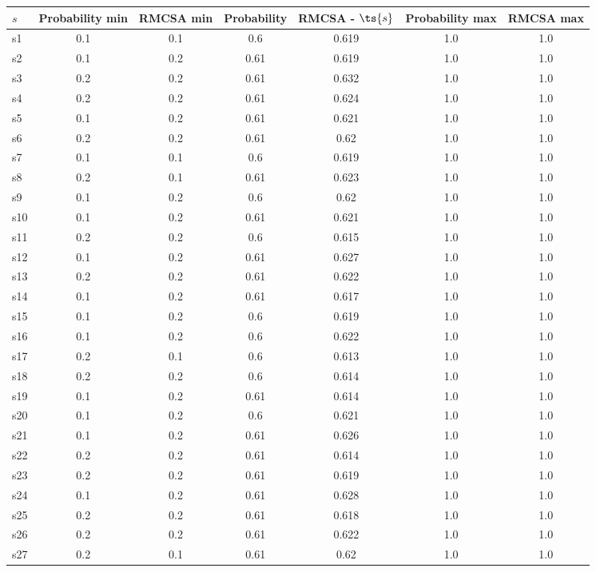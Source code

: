 \documentclass{article}
\begin{document}
\noindent\begin{tabular}{|l|c|c|c|c|c|c|}
\hline
$s$& Probability min & RMCSA min & Probability & RMCSA - $\ts{s}$ & Probability max & RMCSA max\\
\hline
s1 &0.1 & 0.1 & 0.6 & 0.619 & 1.0 & 1.0\\
\hline
s2 &0.1 & 0.2 & 0.61 & 0.619 & 1.0 & 1.0\\
\hline
s3 &0.2 & 0.2 & 0.61 & 0.632 & 1.0 & 1.0\\
\hline
s4 &0.2 & 0.2 & 0.61 & 0.624 & 1.0 & 1.0\\
\hline
s5 &0.1 & 0.2 & 0.61 & 0.621 & 1.0 & 1.0\\
\hline
s6 &0.2 & 0.2 & 0.61 & 0.62 & 1.0 & 1.0\\
\hline
s7 &0.1 & 0.1 & 0.6 & 0.619 & 1.0 & 1.0\\
\hline
s8 &0.2 & 0.1 & 0.61 & 0.623 & 1.0 & 1.0\\
\hline
s9 &0.1 & 0.2 & 0.6 & 0.62 & 1.0 & 1.0\\
\hline
s10 &0.1 & 0.2 & 0.61 & 0.621 & 1.0 & 1.0\\
\hline
s11 &0.2 & 0.2 & 0.6 & 0.615 & 1.0 & 1.0\\
\hline
s12 &0.1 & 0.2 & 0.61 & 0.627 & 1.0 & 1.0\\
\hline
s13 &0.2 & 0.2 & 0.61 & 0.622 & 1.0 & 1.0\\
\hline
s14 &0.1 & 0.2 & 0.61 & 0.617 & 1.0 & 1.0\\
\hline
s15 &0.1 & 0.2 & 0.6 & 0.619 & 1.0 & 1.0\\
\hline
s16 &0.1 & 0.2 & 0.6 & 0.622 & 1.0 & 1.0\\
\hline
s17 &0.2 & 0.1 & 0.6 & 0.613 & 1.0 & 1.0\\
\hline
s18 &0.2 & 0.2 & 0.6 & 0.614 & 1.0 & 1.0\\
\hline
s19 &0.1 & 0.2 & 0.61 & 0.614 & 1.0 & 1.0\\
\hline
s20 &0.1 & 0.2 & 0.6 & 0.621 & 1.0 & 1.0\\
\hline
s21 &0.1 & 0.2 & 0.61 & 0.626 & 1.0 & 1.0\\
\hline
s22 &0.2 & 0.2 & 0.61 & 0.614 & 1.0 & 1.0\\
\hline
s23 &0.2 & 0.2 & 0.61 & 0.619 & 1.0 & 1.0\\
\hline
s24 &0.1 & 0.2 & 0.61 & 0.628 & 1.0 & 1.0\\
\hline
s25 &0.2 & 0.2 & 0.61 & 0.618 & 1.0 & 1.0\\
\hline
s26 &0.2 & 0.2 & 0.61 & 0.622 & 1.0 & 1.0\\
\hline
s27 &0.2 & 0.1 & 0.61 & 0.62 & 1.0 & 1.0\\

\end{tabular}
\end{document}
